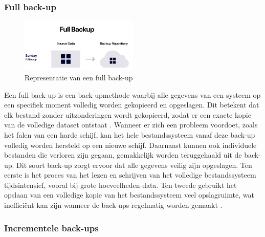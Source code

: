\subsubsection{Full back-up}%
\begin{figure}[h] 
    \centering
    \includegraphics[width=0.5\textwidth]{img/fullb.png}  
    \caption{Representatie van een full back-up \autocite{Rivas2022}}   
    \label{fig:fullback-up}           
\end{figure}
Een full back-up is een back-upmethode waarbij alle gegevens van een systeem op een specifiek moment volledig worden gekopieerd en opgeslagen. Dit betekent dat elk bestand zonder uitzonderingen wordt gekopieerd, zodat er een exacte kopie van de volledige dataset ontstaat \autocite{Beard2018}. Wanneer er zich een probleem voordoet, zoals het falen van een harde schijf, kan het hele bestandssysteem vanaf deze back-up volledig worden hersteld op een nieuwe schijf. Daarnaast kunnen ook individuele bestanden die verloren zijn gegaan, gemakkelijk worden teruggehaald uit de back-up. Dit soort back-up zorgt ervoor dat alle gegevens veilig zijn opgeslagen. Ten eerste is het proces van het lezen en schrijven van het volledige bestandssysteem tijdsintensief, vooral bij grote hoeveelheden data. Ten tweede gebruikt het opslaan van een volledige kopie van het bestandssysteem veel opslagruimte, wat inefficiënt kan zijn wanneer de back-ups regelmatig worden gemaakt \autocite{Chervenak1998}.


\subsubsection{Incrementele back-ups}

